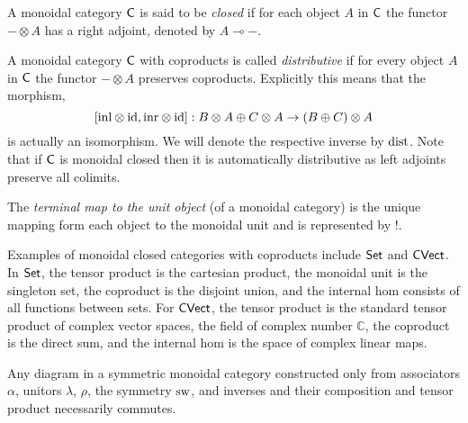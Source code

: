 \begin{definition}
  A monoidal category $\mathsf{C}$ is  said to be \emph{closed} if for each object
  $A$ in $\mathsf{C}$ the functor $- \otimes A$ has a right adjoint,
  denoted by $A \multimap -$. 
\end{definition}

\begin{definition}
        A monoidal category $\mathsf{C}$ with coproducts is called
        \emph{distributive} if for every object $A$ in $\mathsf{C}$ the
        functor $- \otimes A$ preserves coproducts. Explicitly
        this means that the morphism,
        \[
                [\mathrm{inl} \otimes \mathrm{id}, \mathrm{inr} \otimes \mathrm{id}] : B \otimes A \oplus C \otimes                     A \to (B \oplus C) \otimes A
        \]
        is actually an isomorphism. We will denote the respective inverse
        by $\mathrm{dist}$. Note that if $\mathsf{C}$ is monoidal closed then it is automatically
        distributive as left adjoints preserve all colimits.
\end{definition}


\begin{definition}
        The \emph{terminal map to the unit object} (of a monoidal category) is the unique mapping form each object to the monoidal unit and is represented by $!$.
\end{definition}


\begin{example}
Examples of monoidal closed categories with coproducts include $\mathsf{Set}$ and $\mathsf{CVect}$. In $\mathsf{Set}$, the tensor product is the cartesian product, the monoidal unit is the singleton set, the coproduct is the disjoint union, and the internal hom consists of all functions between sets. For $\mathsf{CVect}$, the tensor product is the standard tensor product of complex vector spaces, the field of complex number $\mathbb{C}$, the coproduct is the direct sum, and the internal hom is the space of complex linear maps. %
\end{example}


\begin{theorem}
Any diagram in a symmetric monoidal category constructed only from associators $\alpha$, unitors $\lambda$, $\rho$, the symmetry $\mathrm{sw}$, and inverses and their composition and tensor product necessarily commutes.
\end{theorem}


